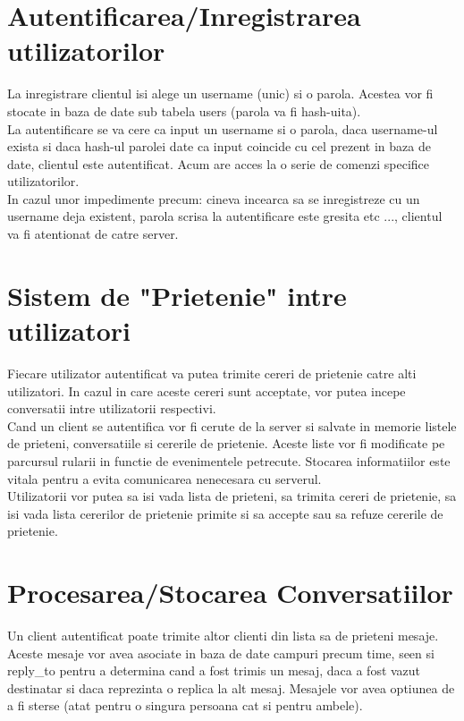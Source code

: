 \documentclass[runningheads]{llncs}
\begin{document}
\section{Autentificarea/Inregistrarea utilizatorilor}
La inregistrare clientul isi alege un username (unic) si o parola. Acestea vor fi stocate in baza de date sub tabela users (parola va fi hash-uita). \\
La autentificare se va cere ca input un username si o parola, daca username-ul exista si daca hash-ul parolei date ca input coincide cu cel prezent in baza de date, clientul este autentificat. Acum are acces la o serie de comenzi specifice utilizatorilor. \\
In cazul unor impedimente precum: cineva incearca sa se inregistreze cu un username deja existent, parola scrisa la autentificare este gresita etc ..., clientul va fi atentionat de catre server.\\

\section{Sistem de "Prietenie" intre utilizatori}
Fiecare utilizator autentificat va putea trimite cereri de prietenie catre alti utilizatori. In cazul in care aceste cereri sunt acceptate, vor putea incepe conversatii intre utilizatorii respectivi. \\
Cand un client se autentifica vor fi cerute de la server si salvate in memorie listele de prieteni, conversatiile si cererile de prietenie. Aceste liste vor fi modificate pe parcursul rularii in functie de evenimentele petrecute. Stocarea informatiilor este vitala pentru a evita comunicarea nenecesara cu serverul.\\
Utilizatorii vor putea sa isi vada lista de prieteni, sa trimita cereri de prietenie, sa isi vada lista cererilor de prietenie primite si sa accepte sau sa refuze cererile de prietenie.\\

\section{ Procesarea/Stocarea Conversatiilor }
Un client autentificat poate trimite altor clienti din lista sa de prieteni mesaje. Aceste mesaje vor avea asociate in baza de date campuri precum time, seen si reply\_to pentru a determina cand a fost trimis un mesaj, daca a fost vazut destinatar si daca reprezinta o replica la alt mesaj. Mesajele vor avea optiunea de a fi sterse (atat pentru o singura persoana cat si pentru ambele).\\
\end{document}
